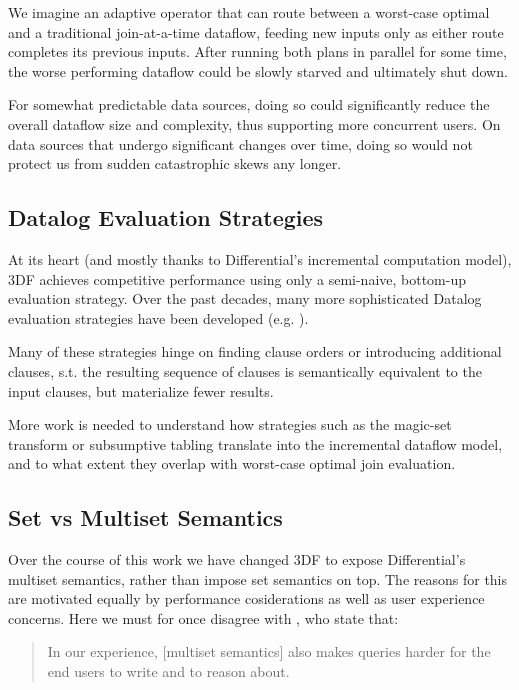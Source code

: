 \documentclass[../index.tex]{subfiles}
\begin{document}
We imagine an adaptive operator that can route between a worst-case
optimal and a traditional join-at-a-time dataflow, feeding new inputs
only as either route completes its previous inputs. After running both
plans in parallel for some time, the worse performing dataflow could
be slowly starved and ultimately shut down.

For somewhat predictable data sources, doing so could significantly
reduce the overall dataflow size and complexity, thus supporting more
concurrent users. On data sources that undergo significant changes
over time, doing so would not protect us from sudden catastrophic
skews any longer.

\subsection{Datalog Evaluation Strategies}

At its heart (and mostly thanks to Differential's incremental
computation model), 3DF achieves competitive performance using only a
semi-naive, bottom-up evaluation strategy. Over the past decades, many
more sophisticated Datalog evaluation strategies have been developed
(e.g. \cite{tekle2011more}).

Many of these strategies hinge on finding clause orders or introducing
additional clauses, s.t. the resulting sequence of clauses is
semantically equivalent to the input clauses, but materialize fewer
results.

More work is needed to understand how strategies such as the magic-set
transform or subsumptive tabling translate into the incremental
dataflow model, and to what extent they overlap with worst-case
optimal join evaluation.

\subsection{Set vs Multiset Semantics} \label{set-vs-multiset}

Over the course of this work we have changed 3DF to expose
Differential's multiset semantics, rather than impose set semantics on
top. The reasons for this are motivated equally by performance
cosiderations as well as user experience concerns. Here we must for
once disagree with \cite{aref2015design}, who state that:

\begin{quote}
  In our experience, [multiset semantics] also makes queries harder
  for the end users to write and to reason about.
\end{quote}
\end{document}
